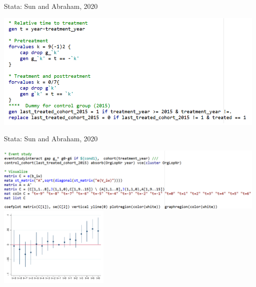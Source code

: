 \documentclass[notes,11pt, aspectratio=169]{beamer}
\begin{document}
\begin{frame}{Stata: Sun and Abraham, 2020 }
        \begin{center}
     \includegraphics[width=\textwidth]{code1.png}
    \end{center}  
\end{frame}

\begin{frame}{Stata: Sun and Abraham, 2020}
        \begin{center}
     \includegraphics[width=\textwidth]{code2.png}
    \includegraphics[width=0.4\textwidth]{Plot_Event_1.pdf}
    \end{center}  
\end{frame}
\end{document}
